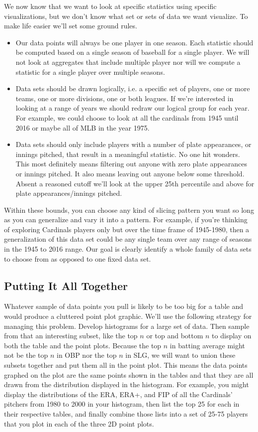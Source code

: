 \documentclass[10pt]{article}
\begin{document}
We now know that we want to look at specific statistics using specific visualizations, but we don't know what set or sets of data we want visualize. To make life easier we'll set some ground rules.

\begin{itemize}
  \item Our data points will always be one player in one season. Each statistic should be computed based on a single season of baseball for a single player. We will not look at aggregates that include multiple player nor will we compute a statistic for a single player over multiple seasons.
  \item Data sets should be drawn logically, i.e. a specific set of players, one or more teams, one or more divisions, one or both leagues. If we're interested in looking at a range of years we should redraw our logical group for each year. For example, we could choose to look at all the cardinals from 1945 until 2016 or maybe all of MLB in the year 1975.
  \item Data sets should only include players with a number of plate appearances, or innings pitched, that result in a meaningful statistic. No one hit wonders. This most definitely means filtering out anyone with zero plate appearances or innings pitched. It also means leaving out anyone below some threshold. Absent a reasoned cutoff we'll look at the upper 25th percentile and above for plate appearances/innings pitched.
\end{itemize}

Within these bounds, you can choose any kind of slicing pattern you want so long as you can generalize and vary it into a pattern. For example, if you're thinking of exploring Cardinals players only but over the time frame of 1945-1980, then a generalization of this data set could be any single team over any range of seasons in the 1945 to 2016 range. Our goal is clearly identify a whole family of data sets to choose from as opposed to one fixed data set.

\subsection*{Putting It All Together}

Whatever sample of data points you pull is likely to be too big for a table and would produce a cluttered point plot graphic. We'll use the following strategy for managing this problem. Develop histograms for a large set of data. Then sample from that an interesting subset, like the top \(n\) or top and bottom \(n\) to display on both the table and the point plots. Because the top \(n\) in batting average might not be the top \(n\) in OBP nor the top \(n\) in SLG, we will want to union these subsets together and put them all in the point plot. This means the data points graphed on the plot are the same points shown in the tables and that they are all drawn from the distribution displayed in the histogram. For example, you might display the distributions of the ERA, ERA+, and FIP of all the Cardinals' pitchers from 1980 to 2000 in your histogram, then list the top 25 for each in their respective tables, and finally combine those lists into a set of 25-75 players that you plot in each of the three 2D point plots.
\end{document}
